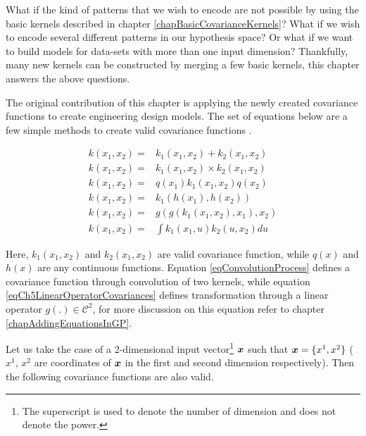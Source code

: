 What if the kind of patterns that we wish to encode are not possible by using the basic kernels described in chapter \ref{chapBasicCovarianceKernels}? What if we wish to encode several different patterns in our hypothesis space? Or what if we want to build models for data-sets with more than one input dimension? Thankfully, many new kernels can be constructed by merging a few basic kernels, this chapter answers the above questions. 

The original contribution of this chapter is applying the newly created covariance functions to create engineering design models. The set of equations below are a few simple methods to create valid covariance functions \cite{bishop2006pattern, mackay2003information, durrande2001etude, durrande2013anova}. 

\begin{align}
k(x_{1}, x_{2}) =  & k_{1}(x_{1}, x_{2}) + k_{2}(x_{1}, x_{2})  \label{eqCh5AddingCovariances} \\
k(x_{1}, x_{2}) =  & k_{1}(x_{1}, x_{2}) \times k_{2}(x_{1}, x_{2}) \label{eqCh5MultiplyingCovariances} \\
k(x_{1}, x_{2}) =  & q(x_{1})k_{1}(x_{1}, x_{2})q(x_{2}) \label{eqCh5MultiplyingWithFunction} \\
k(x_{1}, x_{2}) =  & k_{1}(h(x_{1}), h(x_{2})) \label{eqCh5ComposedCovariances} \\
k(x_{1}, x_{2}) =  & g(g(k_{1}(x_{1}, x_{2}), x_{1}), x_{2} ) \label{eqCh5LinearOperatorCovariances} \\
k(x_{1}, x_{2}) = & \int k_{1}(x_{1}, u)k_{2}(u, x_{2})du \label{eqConvolutionProcess}
\end{align}


Here, $k_{1}(x_{1}, x_{2})$ and $k_{2}(x_{1}, x_{2})$ are valid covariance function, while $q(x)$ and $h(x)$ are any continuous functions. Equation \ref{eqConvolutionProcess} defines a covariance function through convolution of two kernels, while equation \ref{eqCh5LinearOperatorCovariances} defines transformation through a linear operator $g\left ( . \right ) \in \mathcal{C}^{2}$, for more discussion on this equation refer to chapter \ref{chapAddingEquationsInGP}. 

Let us take the case of a 2-dimensional input vector\footnote{The superscript is used to denote the number of dimension and does not denote the power.} $\boldsymbol{x}$ such that $\boldsymbol{x} = \{x^{1}, x^{2}\}$ ($x^{1}$, $x^{2}$ are coordinates of $\boldsymbol{x}$ in the first and second dimension respectively). Then the following covariance functions are also valid.

